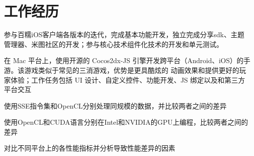 \documentclass[]{deedy-resume-document-class}
\begin{document}
\hfill
\begin{minipage}[t]{0.66\textwidth} 


\section{工作经历}
\vspace{1mm } 
\vspace{\topsep} 
\begin{tightemize}
\item 参与百糯iOS客户端各版本的迭代，完成基本功能开发，独立完成分享sdk、主题管理器、米图社区的开发；参与核心技术组件化技术的开发和单元测试。
\end{tightemize}
\sectionsep


\vspace{1mm } 
\begin{tightemize}
\item 在 Mac 平台上，使用开源的 Cocos2dx-JS 引擎开发跨平台（Android、iOS）的手游。该游戏类似于常见的三消游戏，优势是更具酷炫的
动画效果和提供更好的玩家体验；工作任务包括 UI 设计、自定义控件、功能开发、JS 绑定以及和第三方平台交互
\end{tightemize}
\sectionsep


\vspace{1mm } 
\begin{tightemize}
\item 使用SSE指令集和OpenCL分别处理同规模的数据，并比较两者之间的差异
\item 使用OpenCL和CUDA语言分别在Intel和NVIDIA的GPU上编程，比较两者之间的差异
\item 对比不同平台上的各性能指标并分析导致性能差异的因素  %
\end{tightemize}
\sectionsep



\end{minipage}
\end{document}
